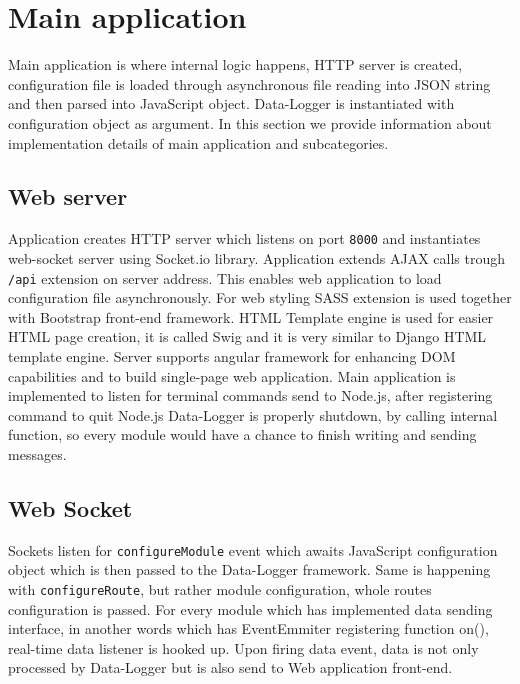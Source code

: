 \section{Main application} %
\label{sec:main_application}
Main application is where internal logic happens, HTTP server is created, configuration file is loaded through asynchronous file reading into JSON string and then parsed into JavaScript object. Data-Logger is instantiated with configuration object as argument. In this section we provide information about implementation details of main application and subcategories.
\subsection{Web server} %
\label{sub:web_server}
Application creates HTTP server which listens on port \verb|8000| and instantiates web-socket server using Socket.io library. Application extends AJAX calls trough \verb|/api| extension on server address.
This enables web application to load configuration file asynchronously. For web styling SASS extension is used together with Bootstrap front-end framework. HTML Template engine is used for easier HTML page creation, it is called Swig and it is very similar to Django HTML template engine. Server supports angular framework for enhancing DOM capabilities and to build single-page web application. Main application is implemented to listen for terminal commands send to Node.js, after registering command to quit Node.js Data-Logger is properly shutdown, by calling internal function, so every module would have a chance to finish writing and sending messages.%
\subsection{Web Socket} %
\label{sub:web_socket}
Sockets listen for \verb|configureModule| event which awaits JavaScript configuration object which is then passed to the Data-Logger framework. Same is happening with \verb|configureRoute|, but rather module configuration, whole routes configuration is passed. For every module which has implemented data sending interface, in another words which has EventEmmiter registering function on(), real-time data listener is hooked up. Upon firing data event, data is not only processed by Data-Logger but is also send to Web application front-end.
